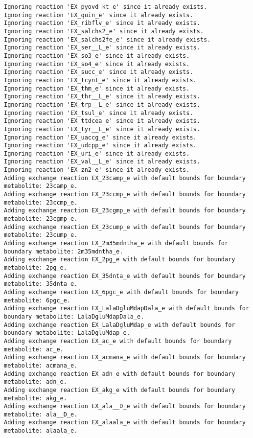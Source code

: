 \documentclass[
  letterpaper,
  DIV=11,
  numbers=noendperiod]{scrartcl}
\begin{document}
\begin{verbatim}
Ignoring reaction 'EX_pyovd_kt_e' since it already exists.
Ignoring reaction 'EX_quin_e' since it already exists.
Ignoring reaction 'EX_ribflv_e' since it already exists.
Ignoring reaction 'EX_salchs2_e' since it already exists.
Ignoring reaction 'EX_salchs2fe_e' since it already exists.
Ignoring reaction 'EX_ser__L_e' since it already exists.
Ignoring reaction 'EX_so3_e' since it already exists.
Ignoring reaction 'EX_so4_e' since it already exists.
Ignoring reaction 'EX_succ_e' since it already exists.
Ignoring reaction 'EX_tcynt_e' since it already exists.
Ignoring reaction 'EX_thm_e' since it already exists.
Ignoring reaction 'EX_thr__L_e' since it already exists.
Ignoring reaction 'EX_trp__L_e' since it already exists.
Ignoring reaction 'EX_tsul_e' since it already exists.
Ignoring reaction 'EX_ttdcea_e' since it already exists.
Ignoring reaction 'EX_tyr__L_e' since it already exists.
Ignoring reaction 'EX_uaccg_e' since it already exists.
Ignoring reaction 'EX_udcpp_e' since it already exists.
Ignoring reaction 'EX_uri_e' since it already exists.
Ignoring reaction 'EX_val__L_e' since it already exists.
Ignoring reaction 'EX_zn2_e' since it already exists.
Adding exchange reaction EX_23camp_e with default bounds for boundary metabolite: 23camp_e.
Adding exchange reaction EX_23ccmp_e with default bounds for boundary metabolite: 23ccmp_e.
Adding exchange reaction EX_23cgmp_e with default bounds for boundary metabolite: 23cgmp_e.
Adding exchange reaction EX_23cump_e with default bounds for boundary metabolite: 23cump_e.
Adding exchange reaction EX_2m35mdntha_e with default bounds for boundary metabolite: 2m35mdntha_e.
Adding exchange reaction EX_2pg_e with default bounds for boundary metabolite: 2pg_e.
Adding exchange reaction EX_35dnta_e with default bounds for boundary metabolite: 35dnta_e.
Adding exchange reaction EX_6pgc_e with default bounds for boundary metabolite: 6pgc_e.
Adding exchange reaction EX_LalaDgluMdapDala_e with default bounds for boundary metabolite: LalaDgluMdapDala_e.
Adding exchange reaction EX_LalaDgluMdap_e with default bounds for boundary metabolite: LalaDgluMdap_e.
Adding exchange reaction EX_ac_e with default bounds for boundary metabolite: ac_e.
Adding exchange reaction EX_acmana_e with default bounds for boundary metabolite: acmana_e.
Adding exchange reaction EX_adn_e with default bounds for boundary metabolite: adn_e.
Adding exchange reaction EX_akg_e with default bounds for boundary metabolite: akg_e.
Adding exchange reaction EX_ala__D_e with default bounds for boundary metabolite: ala__D_e.
Adding exchange reaction EX_alaala_e with default bounds for boundary metabolite: alaala_e.

\end{verbatim}
\end{document}

